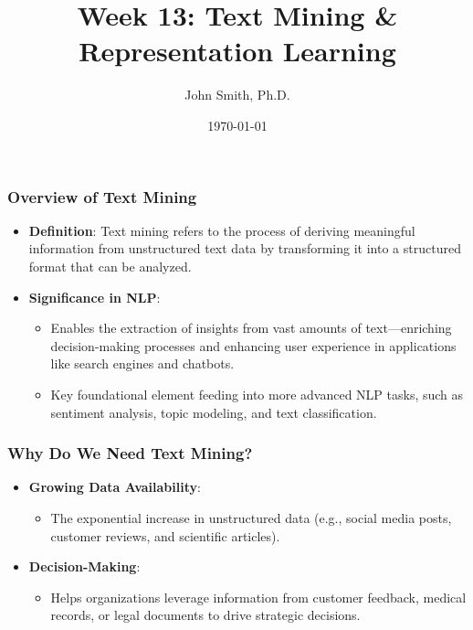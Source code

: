 \documentclass[aspectratio=169]{beamer}
\title[Week 13: Text Mining & Representation Learning]{Week 13: Text Mining \& Representation Learning}
\author[J. Smith]{John Smith, Ph.D.}
\institute[University Name]{
  Department of Computer Science\\
  University Name\\
  \vspace{0.3cm}
  Email: email@university.edu\\
  Website: www.university.edu
}
\date{\today}
\begin{document}
\frame{\titlepage}

\begin{frame}[fragile]
    \titlepage
\end{frame}

\begin{frame}[fragile]
    \frametitle{Overview of Text Mining}

    \begin{itemize}
        \item \textbf{Definition}: Text mining refers to the process of deriving meaningful information from unstructured text data by transforming it into a structured format that can be analyzed.
        \item \textbf{Significance in NLP}:
        \begin{itemize}
            \item Enables the extraction of insights from vast amounts of text—enriching decision-making processes and enhancing user experience in applications like search engines and chatbots.
            \item Key foundational element feeding into more advanced NLP tasks, such as sentiment analysis, topic modeling, and text classification.
        \end{itemize}
    \end{itemize}
\end{frame}

\begin{frame}[fragile]
    \frametitle{Why Do We Need Text Mining?}

    \begin{itemize}
        \item \textbf{Growing Data Availability}:
        \begin{itemize}
            \item The exponential increase in unstructured data (e.g., social media posts, customer reviews, and scientific articles).
        \end{itemize}
        \item \textbf{Decision-Making}:
        \begin{itemize}
            \item Helps organizations leverage information from customer feedback, medical records, or legal documents to drive strategic decisions.
        \end{itemize}
    \end{itemize}
\end{frame}
\end{document}
